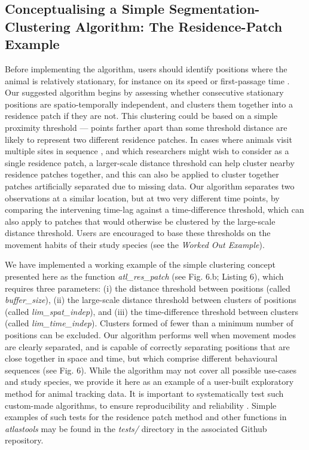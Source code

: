\begin{refsection}[sorting=nyt]
    \subsection*{Conceptualising a Simple Segmentation-Clustering Algorithm: The Residence-Patch Example}

    Before implementing the algorithm, users should identify positions where the animal is relatively stationary, for instance on its speed or first-passage time \citep{bracis2018,barraquand2008}.
    Our suggested algorithm begins by assessing whether consecutive stationary positions are spatio-temporally independent, and clusters them together into a residence patch if they are not.
    This clustering could be based on a simple proximity threshold --- points farther apart than some threshold distance are likely to represent two different residence patches.
    In cases where animals visit multiple sites in sequence \citep[such as traplining][]{thomson1997}, and which researchers might wish to consider as a single residence patch, a larger-scale distance threshold can help cluster nearby residence patches together, and this can also be applied to cluster together patches artificially separated due to missing data.
    Our algorithm separates two observations at a similar location, but at two very different time points, by comparing the intervening time-lag against a time-difference threshold, which can also apply to patches that would otherwise be clustered by the large-scale distance threshold.
    Users are encouraged to base these thresholds on the movement habits of their study species (see the \textit{Worked Out Example}).

    We have implemented a working example of the simple clustering concept presented here as the function \textit{atl\_res\_patch} (see Fig. 6.b; {\color{red} Listing} 6), which requires three parameters: (i) the distance threshold between positions (called \textit{buffer\_size}), (ii) the large-scale distance threshold between clusters of positions (called \textit{lim\_spat\_indep}), and (iii) the time-difference threshold between clusters (called \textit{lim\_time\_indep}).
    Clusters formed of fewer than a minimum number of positions can be excluded.
    Our algorithm performs well when movement modes are clearly separated, and is capable of correctly separating positions that are close together in space and time, but which comprise different behavioural sequences (see Fig. 6).
    While the algorithm may not cover all possible use-cases and study species, we provide it here as an example of a user-built exploratory method for animal tracking data.
    It is important to systematically test such custom-made algorithms, to ensure reproducibility and reliability \citep{wickham2015, marwick2018}.
    Simple examples of such tests for the residence patch method and other functions in \textit{atlastools} may be found in the \textit{tests/} directory in the associated Github repository.


\end{refsection}
